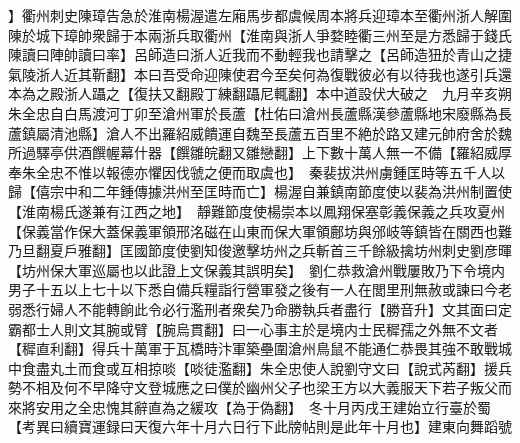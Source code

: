 】衢州刺史陳璋告急於淮南楊渥遣左廂馬步都虞候周本將兵迎璋本至衢州浙人解圍陳於城下璋帥衆歸于本兩浙兵取衢州【淮南與浙人爭婺睦衢三州至是方悉歸于錢氏陳讀曰陣帥讀曰率】呂師造曰浙人近我而不動輕我也請擊之【呂師造狃於青山之捷氣陵浙人近其靳翻】本曰吾受命迎陳使君今至矣何為復戰彼必有以待我也遂引兵還本為之殿浙人躡之【復扶又翻殿丁練翻躡尼輒翻】本中道設伏大破之　九月辛亥朔朱全忠自白馬渡河丁卯至滄州軍於長蘆【杜佑曰滄州長蘆縣漢參蘆縣地宋廢縣為長蘆鎮屬清池縣】滄人不出羅紹威饋運自魏至長蘆五百里不絶於路又建元帥府舍於魏所過驛亭供酒饌幄幕什器【饌雛皖翻又雛戀翻】上下數十萬人無一不備【羅紹威厚奉朱全忠不惟以報德亦懼因伐虢之便而取虞也】　秦裴拔洪州虜鍾匡時等五千人以歸【僖宗中和二年鍾傳據洪州至匡時而亡】楊渥自兼鎮南節度使以裴為洪州制置使【淮南楊氏遂兼有江西之地】　靜難節度使楊崇本以鳳翔保塞彰義保義之兵攻夏州【保義當作保大蓋保義軍領邢洺磁在山東而保大軍領鄜坊與邠岐等鎮皆在關西也難乃旦翻夏戶雅翻】匡國節度使劉知俊邀擊坊州之兵斬首三千餘級擒坊州刺史劉彦暉【坊州保大軍巡屬也以此證上文保義其誤明矣】　劉仁恭救滄州戰屢敗乃下令境内男子十五以上七十以下悉自備兵糧詣行營軍發之後有一人在閭里刑無赦或諫曰今老弱悉行婦人不能轉餉此令必行濫刑者衆矣乃命勝執兵者盡行【勝音升】文其面曰定霸都士人則文其腕或臂【腕烏貫翻】曰一心事主於是境内士民穉孺之外無不文者【穉直利翻】得兵十萬軍于瓦橋時汴軍築壘圍滄州鳥鼠不能通仁恭畏其強不敢戰城中食盡丸土而食或互相掠啖【啖徒濫翻】朱全忠使人說劉守文曰【說式芮翻】援兵勢不相及何不早降守文登城應之曰僕於幽州父子也梁王方以大義服天下若子叛父而來將安用之全忠愧其辭直為之緩攻【為于偽翻】　冬十月丙戌王建始立行臺於蜀【考異曰續寶運録曰天復六年十月六日行下此牓帖則是此年十月也】建東向舞蹈號

